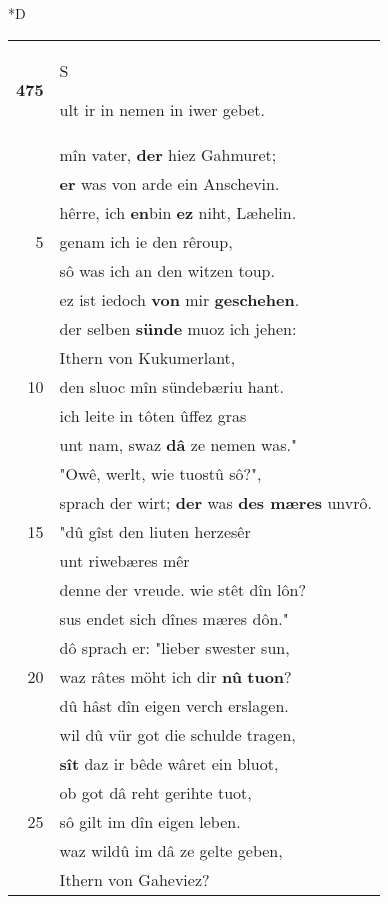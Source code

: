 \documentclass[8pt,a4paper,notitlepage]{article}
\begin{document}
\begin{table}[ht]
\begin{minipage}[t]{0.5\linewidth}
\small
\begin{center}*D
\end{center}
\begin{tabular}{rl}
\textbf{475} & \begin{large}S\end{large}ult ir in nemen in iwer gebet.\\ 
 & mîn vater, \textbf{der} hiez Gahmuret;\\ 
 & \textbf{er} was von arde ein Anschevin.\\ 
 & hêrre, ich \textbf{en}bin \textbf{ez} niht, Læhelin.\\ 
5 & genam ich ie den rêroup,\\ 
 & sô was ich an den witzen toup.\\ 
 & ez ist iedoch \textbf{von} mir \textbf{geschehen}.\\ 
 & der selben \textbf{sünde} muoz ich jehen:\\ 
 & Ithern von Kukumerlant,\\ 
10 & den sluoc mîn sündebæriu hant.\\ 
 & ich leite in tôten ûffez gras\\ 
 & unt nam, swaz \textbf{dâ} ze nemen was."\\ 
 & "Owê, werlt, wie tuostû sô?",\\ 
 & sprach der wirt; \textbf{der} was \textbf{des mæres} unvrô.\\ 
15 & "dû gîst den liuten herzesêr\\ 
 & unt riwebæres mêr\\ 
 & denne der vreude. wie stêt dîn lôn?\\ 
 & sus endet sich dînes mæres dôn."\\ 
 & dô sprach er: "lieber swester sun,\\ 
20 & waz râtes möht ich dir \textbf{nû} \textbf{tuon}?\\ 
 & dû hâst dîn eigen verch erslagen.\\ 
 & wil dû vür got die schulde tragen,\\ 
 & \textbf{sît} daz ir bêde wâret ein bluot,\\ 
 & ob got dâ reht gerihte tuot,\\ 
25 & sô gilt im dîn eigen leben.\\ 
 & waz wildû im dâ ze gelte geben,\\ 
 & Ithern von Gaheviez?\\ 

\end{tabular}
\end{minipage}
\end{table}
\end{document}
